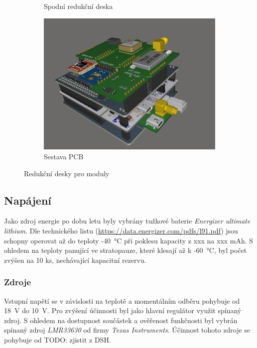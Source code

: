 \documentclass[twoside]{ctuthesis}
\theoremstyle{plain}
\theoremstyle{definition}
\theoremstyle{note}
\begin{document}
\begin{figure}[hbtp]
\begin{subfigure}{.3\textwidth}
				\caption{Spodní redukční deska}
				\label{fig:shield:bot}
			\end{subfigure}
			\begin{subfigure}{.3\textwidth}
				\centering
				\includegraphics[height=0.7\linewidth]{Figures/shield_assembly.png}
				\caption{Sestava PCB}
				\label{fig:shield:assembly}
			\end{subfigure}
			\caption{Redukční desky pro moduly}
			\label{fig:shields:pcb}
		\end{figure}



		
		\subsection{Napájení}
		Jako zdroj energie po dobu letu byly vybrány tužkové baterie \textit{Energizer ultimate lithium}. Dle technického listu (\url{https://data.energizer.com/pdfs/l91.pdf}) jsou schopny operovat až do teploty -40~°C při poklesu kapacity z xxx na xxx mAh. S ohledem na teploty panující ve stratopauze, které klesají až k -60~°C, byl počet zvýšen na 10 ks, nechávající kapacitní rezervu. 

			\subsubsection{Zdroje}
			Vstupní napětí se v závislosti na teplotě a momentálním odběru pohybuje od 18~V do 10~V. Pro zvýšení účinnosti byl jako hlavní regulátor využit spínaný zdroj. S ohledem na dostupnost součástek a ověřenost funkčnosti byl vybrán spínaný zdroj \textit{LMR33630} od firmy \textit{Texas Instruments}. Účinnost tohoto zdroje se pohybuje od TODO: zjistit z DSH. 
\end{document}
